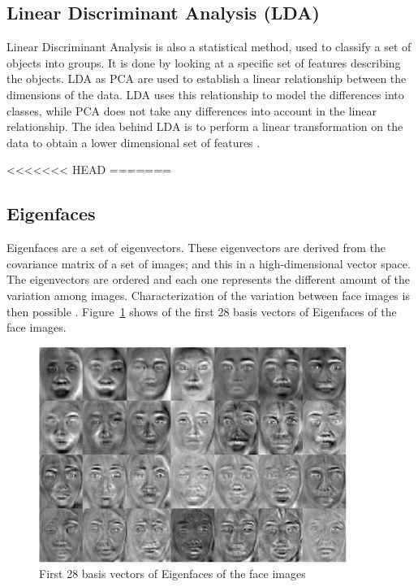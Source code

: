 \subsection{Linear Discriminant Analysis (LDA)}

\vspace{\baselineskip}
\noindent Linear Discriminant Analysis is also a statistical method, used to classify a set of objects into groups. It is done by looking at a specific set of features describing the objects. LDA as PCA are used to establish a linear relationship between the dimensions of the data. LDA uses this relationship to model the differences into classes, while PCA does not take any differences into account in the linear relationship. The idea behind LDA  is to perform a linear transformation on the data to obtain a lower dimensional set of features \cite{GAN08}. \newline

<<<<<<< HEAD
=======
\subsection{Eigenfaces}

\vspace{\baselineskip}
\noindent Eigenfaces are a set of eigenvectors. These eigenvectors are derived from the covariance matrix of a set of images; and this in a high-dimensional vector space. The eigenvectors are ordered and each one represents the different amount of the variation among images. Characterization of the variation between face images is then possible \cite{TUR91}. Figure~\ref{eigenface_example} shows of the first 28 basis vectors of Eigenfaces of the face images.
\newline

\begin{figure}[!h]
\begin{center}
\noindent \includegraphics[scale=1]{figures/eigenface_example} 
\newline
\caption{First 28 basis vectors of Eigenfaces of the face images}
\label{eigenface_example}
\end{center} 
\end{figure}

